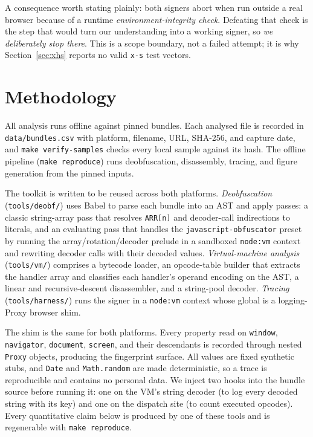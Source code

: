 \documentclass[conference,10pt]{IEEEtran}
\newcommand{\code}[1]{\texttt{\small #1}}
\begin{document}
A consequence worth stating plainly: both signers abort when run outside a real browser because of a runtime \emph{environment-integrity check}. Defeating that check is the step that would turn our understanding into a working signer, so \emph{we deliberately stop there}. This is a scope boundary, not a failed attempt; it is why Section~\ref{sec:xhs} reports no valid \code{x-s} test vectors.

\section{Methodology}
\label{sec:method}
All analysis runs offline against pinned bundles. Each analysed file is recorded in \code{data/bundles.csv} with platform, filename, URL, SHA-256, and capture date, and \code{make verify-samples} checks every local sample against its hash. The offline pipeline (\code{make reproduce}) runs deobfuscation, disassembly, tracing, and figure generation from the pinned inputs.

The toolkit is written to be reused across both platforms. \emph{Deobfuscation} (\code{tools/deobf/}) uses Babel to parse each bundle into an AST and apply passes: a classic string-array pass that resolves \code{ARR[n]} and decoder-call indirections to literals, and an evaluating pass that handles the \code{javascript-obfuscator} preset by running the array/rotation/decoder prelude in a sandboxed \code{node:vm} context and rewriting decoder calls with their decoded values. \emph{Virtual-machine analysis} (\code{tools/vm/}) comprises a bytecode loader, an opcode-table builder that extracts the handler array and classifies each handler's operand encoding on the AST, a linear and recursive-descent disassembler, and a string-pool decoder. \emph{Tracing} (\code{tools/harness/}) runs the signer in a \code{node:vm} context whose global is a logging-Proxy browser shim.

The shim is the same for both platforms. Every property read on \code{window}, \code{navigator}, \code{document}, \code{screen}, and their descendants is recorded through nested \code{Proxy} objects, producing the fingerprint surface. All values are fixed synthetic stubs, and \code{Date} and \code{Math.random} are made deterministic, so a trace is reproducible and contains no personal data. We inject two hooks into the bundle source before running it: one on the VM's string decoder (to log every decoded string with its key) and one on the dispatch site (to count executed opcodes). Every quantitative claim below is produced by one of these tools and is regenerable with \code{make reproduce}.
\end{document}
